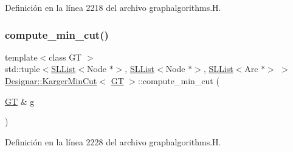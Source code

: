 Definición en la línea 2218 del archivo graphalgorithms.\+H.

\mbox{\label{class_designar_1_1_karger_min_cut_a7a1a4f9e7895ca7923d4f563d6acf689}} 
\subsubsection{\texorpdfstring{compute\+\_\+min\+\_\+cut()}{compute\_min\_cut()}\hspace{0.1cm}{\footnotesize\ttfamily [2/2]}}
{\footnotesize\ttfamily template$<$class GT $>$ \\
std\+::tuple$<$\hyperlink{class_designar_1_1_s_l_list}{S\+L\+List}$<$Node $\ast$$>$, \hyperlink{class_designar_1_1_s_l_list}{S\+L\+List}$<$Node $\ast$$>$, \hyperlink{class_designar_1_1_s_l_list}{S\+L\+List}$<$Arc $\ast$$>$ $>$ \hyperlink{class_designar_1_1_karger_min_cut}{Designar\+::\+Karger\+Min\+Cut}$<$ \hyperlink{demo-buildgraph_8_c_a3001c40d2c31ca87ed96cd7d1334a55e}{GT} $>$\+::compute\+\_\+min\+\_\+cut (\begin{DoxyParamCaption}\item[{\hyperlink{demo-buildgraph_8_c_a3001c40d2c31ca87ed96cd7d1334a55e}{GT} \&}]{g }\end{DoxyParamCaption})\hspace{0.3cm}{\ttfamily [inline]}}



Definición en la línea 2228 del archivo graphalgorithms.\+H.

\mbox{\label{class_designar_1_1_karger_min_cut_a6c61a57cab52387d2c54e6db0bc58aa9}} 
